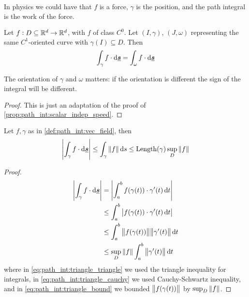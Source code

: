 \documentclass[12pt]{extarticle}
\renewcommand{\vec}[1]{\uvec{#1}}
\begin{document}
\begin{remark}
    In physics we could have that $f$ is a force, $\gamma$ is the position, and the path integral is the work of the force.
\end{remark}

\begin{proposition}
    Let $f: D \subseteq \mathbb{R}^d \to \mathbb{R}^d$, with $f$ of class $C^0$.
    Let $(I, \gamma)$, $(J, \omega)$ representing the same $C^1$-oriented curve with $\gamma(I) \subseteq D$.
    Then
    \begin{equation}
        \int_\gamma f \cdot \dd{\vec s} = \int_\omega f \cdot \dd{\vec s}
    \end{equation}
\end{proposition}

\begin{remark}
    The orientation of $\gamma$ and $\omega$ matters: if the orientation is different the sign of the integral will be different.
\end{remark}

\begin{proof}
    This is just an adaptation of the proof of \autoref{prop:path_int:scalar_indep_speed}.
\end{proof}

\begin{proposition}
    \label{prop:path_int:triangle_ineq}
    Let $f, \gamma$ as in \autoref{def:path_int:vec_field}, then
    \begin{equation}
        \abs{\int_\gamma f \cdot \dd{\vec s}}  \leq \int_\gamma \norm{f} \dd{s} \leq {\operatorfont Length}(\gamma) \sup_D \norm{f}
    \end{equation}
\end{proposition}

\begin{proof}
    \begin{align}
        \abs{\int_\gamma f \cdot \dd{\vec s}} & = \abs{\int_a^b f(\gamma(t)) \cdot \gamma'(t) \dd{t}}                                          \\
                                              & \leq \int_a^b \abs{f(\gamma(t)) \cdot \gamma'(t) \dd{t}} \label{eq:path_int:triangle_triangle} \\
                                              & \leq \int_a^b \norm{f(\gamma(t))} \norm{\gamma'(t)} \dd{t} \label{eq:path_int:triangle_cauchy} \\
                                              & \leq \sup_D \norm{f} \int_a^b \norm{\gamma'(t)} \dd{t} \label{eq:path_int:triangle_bound}
    \end{align}
    where in \autoref{eq:path_int:triangle_triangle} we used the triangle inequality for integrals, in \autoref{eq:path_int:triangle_cauchy} we used Cauchy-Schwartz inequality, and in \autoref{eq:path_int:triangle_bound} we bounded $\norm{f(\gamma(t))}$ by $\sup_D \norm{f}$.
\end{proof}
\end{document}
